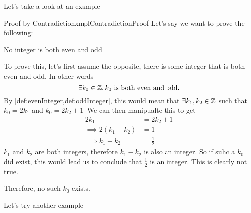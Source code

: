 Let's take a look at an example

\begin{exmpl}[label={exmpl:ContradictionProof}]{Proof by Contradiction}{xmplContradictionProof}
    Let's say we want to prove the following:
    \begin{center}
        No integer is both even and odd
    \end{center}

    To prove this, let's first assume the opposite, there is some integer that is both even and odd. In other words
    $$\exists k_0 \in \mathbb{Z}, k_0 \text{ is both even and odd.}$$
    By \cref{def:evenInteger,def:oddInteger}, this would mean that $\exists k_1,k_2 \in \mathbb{Z}$ such that $k_0 = 2k_1$ and $k_0 = 2k_2 + 1$. We can then manipualte this to get
    \begin{align*}
        2k_1                  & = 2k_2 + 1    \\
        \implies 2(k_1 - k_2) & = 1           \\
        \implies k_1 - k_2    & = \frac{1}{2}
    \end{align*}
    $k_1$ and $k_2$ are both integers, therefore $k_1 - k_2$ is also an integer. So if suhc a $k_0$ did exist, this would lead us to conclude that $\frac{1}{2}$ is an integer. This is clearly not true.

    Therefore, no such $k_0$ exists.
\end{exmpl}
\newpage
Let's try another example

